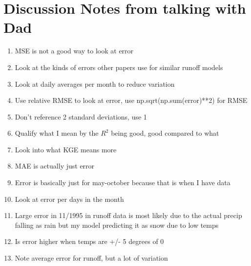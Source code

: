 \documentclass{article}
\begin{document}
\section{Discussion Notes from talking with Dad}
\begin{enumerate}
    \item MSE is not a good way to look at error
    \item Look at the kinds of errors other papers use for similar runoff models
    \item Look at daily averages per month to reduce variation
    \item Use relative RMSE to look at error, use np.sqrt(np.sum(error)**2) for RMSE
    \item Don't reference 2 standard deviations, use 1
    \item Qualify what I mean by the $R^2$ being good, good compared to what
    \item Look into what KGE means more
    \item MAE is actually just error
    \item Error is basically just for may-october because that is when I have data
    \item Look at error per days in the month
    \item Large error in 11/1995 in runoff data is most likely due to the actual precip falling as rain but my model predicting it as snow due to low temps
    \item Is error higher when temps are +/- 5 degrees of 0
    \item Note average error for runoff, but a lot of variation
\end{enumerate}
\end{document}
